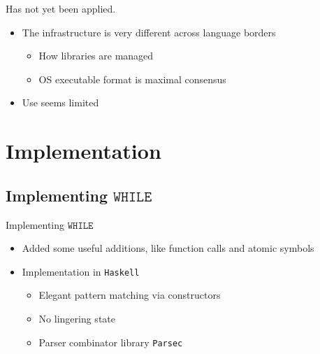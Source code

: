 \documentclass{beamer}
\newcommand*{\WHILE}{\ensuremath{\mathtt{WHILE}}\xspace}
\theoremstyle{definition}
\begin{document}
\begin{frame}
	Has not yet been applied.
	\begin{itemize}
		\item The infrastructure is very different across language borders
			\begin{itemize}
				\item How libraries are managed
				\item OS executable format is maximal consensus
			\end{itemize}
		\item Use seems limited
	\end{itemize}
\end{frame}

\section{Implementation}
\subsection{Implementing \WHILE}
\begin{frame}{Implementing \WHILE}
	\begin{itemize}[<+->]
		\item Added some useful additions, like function calls and atomic symbols 
		\item Implementation in {\tt Haskell}
			\begin{itemize}
				\item Elegant pattern matching via constructors
				\item No lingering state
				\item Parser combinator library {\tt Parsec} 
			\end{itemize}
	\end{itemize}
\end{frame}
\end{document}
